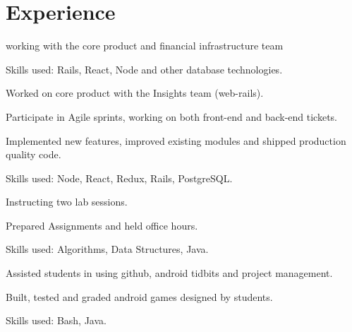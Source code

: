 \documentclass[]{base}
\begin{document}
\begin{minipage}[t]{0.66\textwidth} 
	
	
	\section{Experience}
	
	\vspace{\topsep}
	\begin{tightemize}
		\item working with the core product and financial infrastructure team
		\item Skills used: Rails, React, Node and other database technologies.
	\end{tightemize}
	\sectionsep
	
	\vspace{\topsep}
	\begin{tightemize}
		\item Worked on core product with the Insights team (web-rails).
		\item Participate in Agile sprints, working on both front-end and back-end tickets.
		\item Implemented new features, improved existing modules and shipped production quality code.
		\item Skills used: Node, React, Redux, Rails, PostgreSQL.
	\end{tightemize}
	\sectionsep
	
	\begin{tightemize}
		\item Instructing two lab sessions.
		\item Prepared Assignments and held office hours.
		\item Skills used: Algorithms, Data Structures, Java.
	\end{tightemize}
	\sectionsep
	
	\begin{tightemize}
		\item Assisted students in using github, android tidbits and project management.
		\item Built, tested and graded android games designed by students.
		\item Skills used: Bash, Java.
	\end{tightemize}
	\sectionsep
	

\end{minipage}
\end{document}
